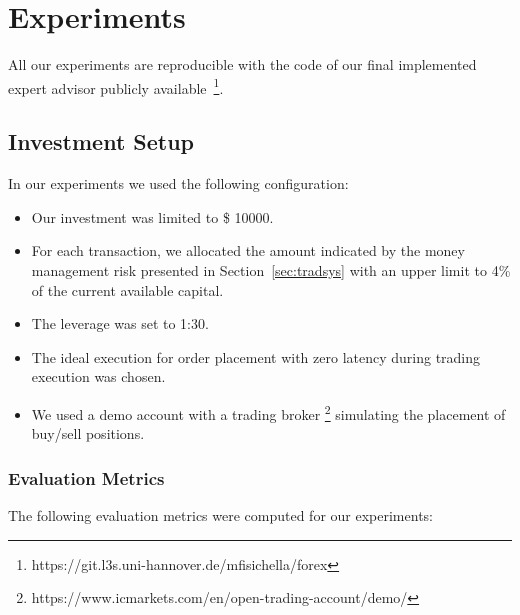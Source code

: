 \section{Experiments}
All our experiments are reproducible with the code of our final implemented expert advisor publicly available~\footnote{https://git.l3s.uni-hannover.de/mfisichella/forex}.

\subsection{Investment Setup}
\noindent In our experiments we used the following configuration:

\begin{itemize}
\setlength\itemsep{0.3em}
\item Our investment was limited to \$ 10000.
\item For each transaction, we allocated the amount indicated by the money management risk presented in Section~\ref{sec:tradsys} with an upper limit to 4\% of the current available capital.
\item The leverage was set to 1:30. 
\item The ideal execution for order placement with zero latency during trading execution was chosen.
\item We used a demo account with a trading broker \footnote{https://www.icmarkets.com/en/open-trading-account/demo/} simulating the placement of buy/sell positions.
\end{itemize}

\subsubsection{Evaluation Metrics}
\noindent The following evaluation metrics were computed for our experiments:

